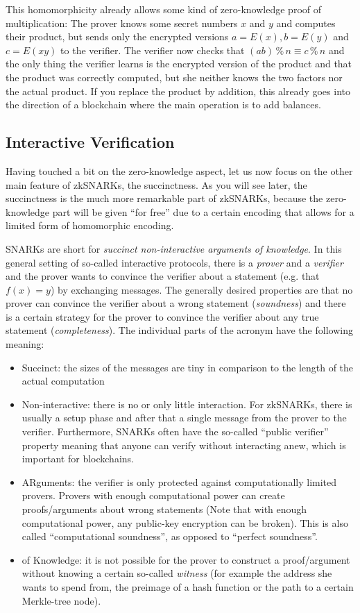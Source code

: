 \documentclass[11pt,letterpaper]{article}
\begin{document}
This homomorphicity already allows some kind of zero-knowledge proof of multiplication: The prover knows some secret numbers $x$ and $y$ and computes their product, but sends only the encrypted versions $a = E(x), b = E(y)$ and $c = E(x y)$ to the verifier. The verifier now checks that $(a b) \mathbin{\%} n  \equiv  c \mathbin{\%} n$ and the only thing the verifier learns is the encrypted version of the product and that the product was correctly computed, but she neither knows the two factors nor the actual product. If you replace the product by addition, this already goes into the direction of a blockchain where the main operation is to add balances.

\subsection{Interactive Verification}


Having touched a bit on the zero-knowledge aspect, let us now focus on the other main feature of zkSNARKs, the succinctness. As you will see later, the succinctness is the much more remarkable part of zkSNARKs, because the zero-knowledge part will be given ``for free'' due to a certain encoding that allows for a limited form of homomorphic encoding.


SNARKs are short for \textit{succinct non-interactive arguments of knowledge}. In this general setting of so-called interactive protocols, there is a \textit{prover} and a \textit{verifier} and the prover wants to convince the verifier about a statement (e.g. that $f(x) = y$) by exchanging messages. The generally desired properties are that no prover can convince the verifier about a wrong statement (\textit{soundness}) and there is a certain strategy for the prover to convince the verifier about any true statement (\textit{completeness}). The individual parts of the acronym have the following meaning:

\begin{itemize}
\item Succinct: the sizes of the messages are tiny in comparison to the length of the actual computation
\item Non-interactive: there is no or only little interaction. For zkSNARKs, there is usually a setup phase and after that a single message from the prover to the verifier. Furthermore, SNARKs often have the so-called ``public verifier'' property meaning that anyone can verify without interacting anew, which is important for blockchains.
\item ARguments: the verifier is only protected against computationally limited provers. Provers with enough computational power can create proofs/arguments about wrong statements (Note that with enough computational power, any public-key encryption can be broken). This is also called ``computational soundness'', as opposed to ``perfect soundness''.
\item of Knowledge: it is not possible for the prover to construct a proof/argument without knowing a certain so-called \textit{witness} (for example the address she wants to spend from, the preimage of a hash function or the path to a certain Merkle-tree node).
\end{itemize}
\end{document}
